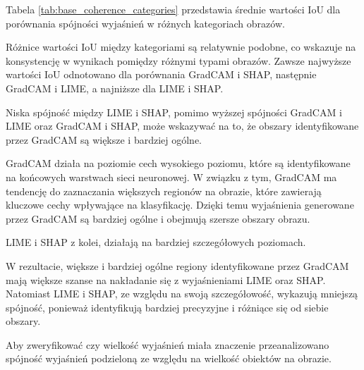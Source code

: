 Tabela \ref{tab:base_coherence_categories} przedstawia średnie wartości IoU dla porównania spójności wyjaśnień w różnych kategoriach obrazów.

Różnice wartości IoU między kategoriami są relatywnie podobne, co wskazuje na konsystencję w wynikach pomiędzy różnymi typami obrazów.
Zawsze najwyższe wartości IoU odnotowano dla porównania GradCAM i SHAP, następnie GradCAM i LIME, a najniższe dla LIME i SHAP.

Niska spójność między LIME i SHAP, pomimo wyższej spójności GradCAM i LIME oraz GradCAM i SHAP, może wskazywać na to, że obszary identyfikowane przez GradCAM są większe i bardziej ogólne.

GradCAM działa na poziomie cech wysokiego poziomu, które są identyfikowane na końcowych warstwach sieci neuronowej.
W związku z tym, GradCAM ma tendencję do zaznaczania większych regionów na obrazie, które zawierają kluczowe cechy wpływające na klasyfikację.
Dzięki temu wyjaśnienia generowane przez GradCAM są bardziej ogólne i obejmują szersze obszary obrazu.

LIME i SHAP z kolei, działają na bardziej szczegółowych poziomach.

W rezultacie, większe i bardziej ogólne regiony identyfikowane przez GradCAM mają większe szanse na nakładanie się z wyjaśnieniami LIME oraz SHAP.
Natomiast LIME i SHAP, ze względu na swoją szczegółowość, wykazują mniejszą spójność, ponieważ identyfikują bardziej precyzyjne i różniące się od siebie obszary.

Aby zweryfikować czy wielkość wyjaśnień miała znaczenie przeanalizowano spójność wyjaśnień podzieloną ze względu na wielkość obiektów na obrazie.

